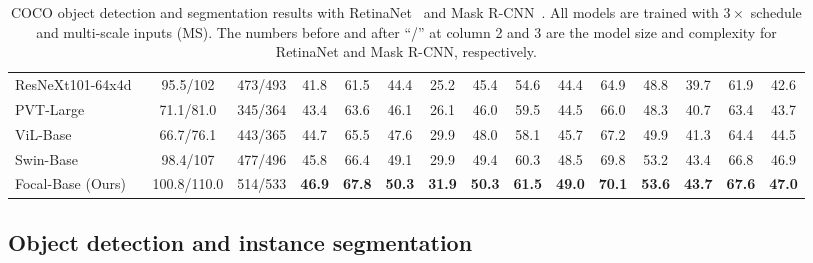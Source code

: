 \documentclass{article}
\begin{document}
\begin{table}[!ht]
\begin{center}
{\begin{tabular}{l|cc|cccccc|cccccc}
\midrule
ResNeXt101-64x4d~\cite{xie2017aggregated} & 95.5/102 & 473/493 & 41.8 & 61.5 & 44.4 & 25.2 & 45.4 & 54.6 & 44.4 & 64.9 & 48.8 & 39.7 & 61.9 & 42.6 \\
PVT-Large\cite{wang2021pyramid} & 71.1/81.0 & 345/364 & 43.4 & 63.6 & 46.1 & 26.1 & 46.0 & 59.5 & 44.5 & 66.0 & 48.3 & 40.7 & 63.4 & 43.7 \\
ViL-Base~\cite{zhang2021multi} & 66.7/76.1 & 443/365 & 44.7 & 65.5 & 47.6 & 29.9 & 48.0 & 58.1 & 45.7 & 67.2 & 49.9 & 41.3 & 64.4 & 44.5 \\
Swin-Base~\cite{liu2021swin} & 98.4/107 & 477/496 & 45.8 & 66.4 & 49.1 & 29.9 & 49.4 & 60.3 & 48.5 & 69.8 & 53.2 & 43.4 & 66.8 & 46.9 \\
\rowcolor{Gray}
Focal-Base (Ours) & 100.8/110.0 & 514/533 & \textbf{46.9} & \textbf{67.8} & \textbf{50.3} & \textbf{31.9} & \textbf{50.3} & \textbf{61.5} & \textbf{49.0} & \textbf{70.1} & \textbf{53.6} & \textbf{43.7} & \textbf{67.6} & \textbf{47.0} \\
\bottomrule
\end{tabular}}
\end{center}
\vspace{2pt}
\caption{COCO object detection and segmentation results with RetinaNet~\cite{lin2017focal} and Mask R-CNN~\cite{he2016deep}. All models are trained with $3\times$ schedule and multi-scale inputs (MS). The numbers before and after ``/'' at column 2 and 3 are the model size and complexity for RetinaNet and Mask R-CNN, respectively.}
\label{tab:object_detection_3x}
\vspace{-2mm}
\end{table}


\subsection{Object detection and instance segmentation}
\end{document}
